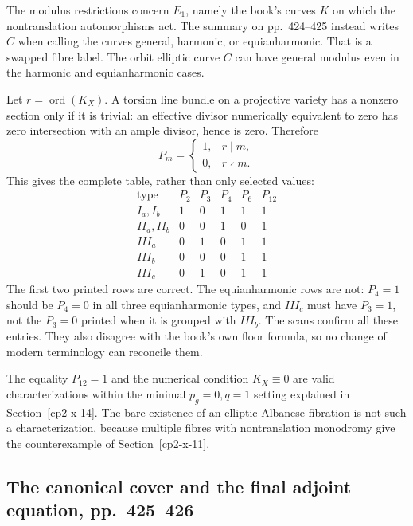 The modulus restrictions concern $E_1$, namely the book's curves $K$ on which the nontranslation automorphisms act. The summary on pp.~424--425 instead writes $C$ when calling the curves general, harmonic, or equianharmonic. That is a swapped fibre label. The orbit elliptic curve $C$ can have general modulus even in the harmonic and equianharmonic cases.

Let $r=\operatorname{ord}(K_X)$. A torsion line bundle on a projective variety has a nonzero section only if it is trivial: an effective divisor numerically equivalent to zero has zero intersection with an ample divisor, hence is zero. Therefore
\begin{equation}
\label{cp2-x-periodic-plurigenera}
 P_m=\begin{cases}1,&r\mid m,\\0,&r\nmid m.\end{cases}
\end{equation}
This gives the complete table, rather than only selected values:
\[
\begin{array}{c|ccccc}
\text{type}&P_2&P_3&P_4&P_6&P_{12}\\\hline
I_a,I_b&1&0&1&1&1\\
II_a,II_b&0&0&1&0&1\\
III_a&0&1&0&1&1\\
III_b&0&0&0&1&1\\
III_c&0&1&0&1&1
\end{array}
\]
The first two printed rows are correct. The equianharmonic rows are not: $P_4=1$ should be $P_4=0$ in all three equianharmonic types, and $III_c$ must have $P_3=1$, not the $P_3=0$ printed when it is grouped with $III_b$. The scans confirm all these entries. They also disagree with the book's own floor formula, so no change of modern terminology can reconcile them.

The equality $P_{12}=1$ and the numerical condition $K_X\equiv0$ are valid characterizations within the minimal $p_g=0,q=1$ setting explained in Section~\ref{cp2-x-14}. The bare existence of an elliptic Albanese fibration is not such a characterization, because multiple fibres with nontranslation monodromy give the counterexample of Section~\ref{cp2-x-11}.

\subsection{The canonical cover and the final adjoint equation, pp.~425--426}

